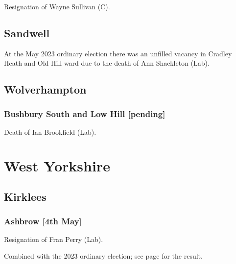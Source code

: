 \documentclass[a4paper,openany]{book}
\begin{document}
\begin{resultsiii}

Resignation of Wayne Sullivan (C).

\subsection*{Sandwell}

At the May 2023 ordinary election there was an unfilled vacancy in Cradley Heath and Old Hill ward due to the death of Ann Shackleton (Lab).%

\subsection*{Wolverhampton}

\subsubsection*{Bushbury South and Low Hill \hspace*{\fill}\nolinebreak[1]%
	\enspace\hspace*{\fill}
	[pending]}


Death of Ian Brookfield (Lab).

\section{West Yorkshire}

\subsection*{Kirklees}

\subsubsection*{Ashbrow \hspace*{\fill}\nolinebreak[1]%
	\enspace\hspace*{\fill}
	[4th May]}


Resignation of Fran Perry (Lab).

Combined with the 2023 ordinary election; see page \pageref{KirkleesAshbrow} for the result.


\end{resultsiii}
\end{document}
